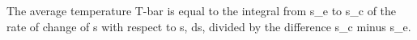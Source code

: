 The average temperature T-bar is equal to the integral from s_e to s_c of the rate of change of s with respect to s, ds, divided by the difference s_c minus s_e.